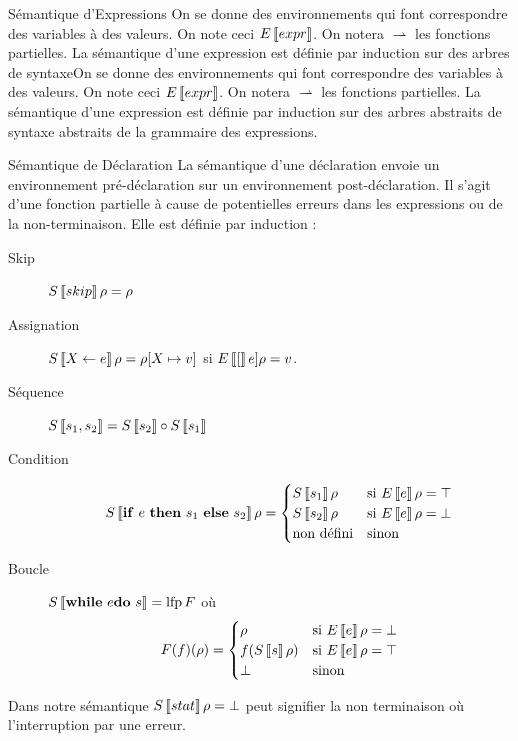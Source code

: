 \documentclass{cours}
\begin{document}
\begin{définition}{Sémantique d'Expressions}{}
On se donne des environnements qui font correspondre des variables à des valeurs. On note ceci $E\left\llbracket expr \right\rrbracket$. On notera $\rightharpoonup$ les fonctions partielles. La sémantique d'une expression est définie par induction sur des arbres de syntaxeOn se donne des environnements qui font correspondre des variables à des valeurs. On note ceci $E\left\llbracket expr \right\rrbracket$. On notera $\rightharpoonup$ les fonctions partielles. La sémantique d'une expression est définie par induction sur des arbres abstraits de syntaxe abstraits de la grammaire des expressions.
\end{définition}

\begin{définition}{Sémantique de Déclaration}{}
La sémantique d'une déclaration envoie un environnement pré-déclaration sur un environnement post-déclaration. Il s'agit d'une fonction partielle à cause de potentielles erreurs dans les expressions ou de la non-terminaison. Elle est définie par induction :
\begin{description}
	\item[Skip] $S\left\llbracket skip \right\rrbracket\rho = \rho$
	\item[Assignation] $S\left\llbracket X \gets e \right\rrbracket\rho = \rho[X \mapsto v]$ si $E\left\llbracket [ \right\rrbracket e]\rho = v$.
	\item[Séquence] $S\left\llbracket s_{1}, s_{2} \right\rrbracket = S\left\llbracket s_{2} \right\rrbracket \circ S\left\llbracket s_{1} \right\rrbracket$
	\item[Condition] \[
		      S\sem{{\bf if}\ e\ {\bf then}\ s_{1}\ {\bf else}\ s_{2}}\rho = \begin{cases}
			      S\sem{s_{1}} \rho & \text{si } E\sem{e} \rho = \top \\
			      S\sem{s_{2}} \rho & \text{si } E\sem{e} \rho = \bot \\
			      \text{non défini} & \text{sinon}
		      \end{cases}
	      \]
	\item[Boucle] $S\left\llbracket {\bf while}\ e {\bf do}\ s \right\rrbracket = \operatorname{lfp} F$ où
	      \[
		      F(f)(\rho) = \begin{cases}
			      \rho            & \text{si } E\left\llbracket e \right\rrbracket \rho = \bot \\
			      f(S\left\llbracket s \right\rrbracket\rho) & \text{si } E\left\llbracket e \right\rrbracket\rho = \top  \\
			      \bot            & \text{sinon}
		      \end{cases}
	      \]
\end{description}
Dans notre sémantique $S\left\llbracket stat \right\rrbracket\rho = \bot$ peut signifier la non terminaison où l'interruption par une erreur.
\end{définition}
\end{document}
